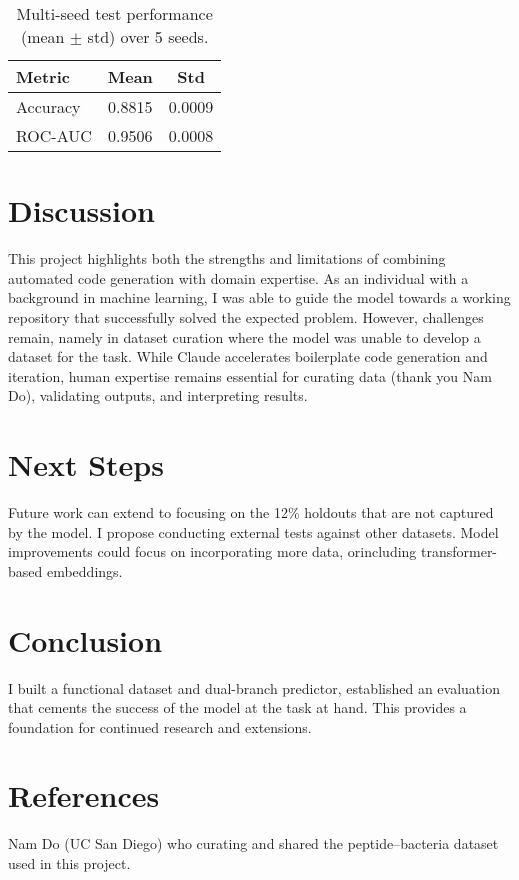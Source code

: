 \documentclass{article}
\begin{document}
\begin{table}[H]
  \centering
  \caption{Multi-seed test performance (mean $\pm$ std) over 5 seeds.}
  \label{tab:summary}
  \begin{tabular}{lcc}
    \toprule
    Metric & Mean & Std \\
    \midrule
    Accuracy & 0.8815 & 0.0009 \\
    ROC-AUC  & 0.9506 & 0.0008 \\
    \bottomrule
  \end{tabular}
\end{table}

\section{Discussion}
This project highlights both the strengths and limitations of combining automated code generation with domain expertise. As an individual with a background in machine learning, I was able to guide the model towards a working repository that successfully solved the expected problem. However, challenges remain, namely in dataset curation where the model was unable to develop a dataset for the task. While Claude accelerates boilerplate code generation and iteration, human expertise remains essential for curating data (thank you Nam Do), validating outputs, and interpreting results. 

\section{Next Steps}
Future work can extend to focusing on the 12\% holdouts that are not captured by the model. I propose conducting external tests against other datasets. Model improvements could focus on incorporating more data, orincluding transformer-based embeddings. 

\section{Conclusion}
I built a functional dataset and dual-branch predictor, established an evaluation that cements the success of the model at the task at hand. This provides a foundation for continued research and extensions.

\section*{References}
Nam Do (UC San Diego) who curating and shared the peptide–bacteria dataset used in this project.
\end{document}
